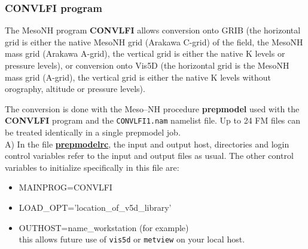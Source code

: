 \subsubsection{{\bf CONVLFI} program} \label{ss:convlfi}
The MesoNH program {\bf CONVLFI} allows conversion onto GRIB 
(the horizontal grid is either the native 
MesoNH grid (Arakawa C-grid) of the field, the MesoNH mass grid
(Arakawa A-grid),
the vertical grid is either the native K levels or pressure levels), or
conversion onto Vis5D (the horizontal grid is the MesoNH mass grid
(A-grid), the vertical grid is either the native K levels without orography,
altitude or pressure levels).

The conversion is done with the Meso--NH procedure {\bf prepmodel} used with 
the {\bf CONVLFI} program and the {\tt CONVLFI1.nam} namelist file.
Up to 24 FM files can be treated identically in a single prepmodel job.
\\

A) In the file \underline{\bf prepmodelrc}, the input and output host, directories
and login control variables refer to the input and output files as usual.
The other control variables to initialize specifically in this file are:
\begin{itemize}
\item MAINPROG=CONVLFI
\item LOAD\_OPT='location\_of\_v5d\_library'
\item OUTHOST=name\_workstation  (for example) \\
this allows future use of {\tt vis5d} or {\tt metview} on your local host.
\end{itemize}

